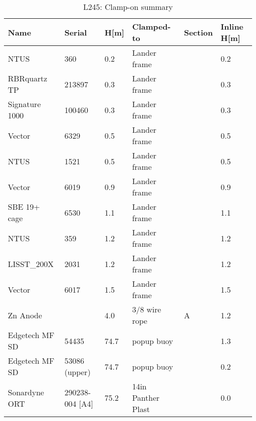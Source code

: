 \documentclass{article}
\begin{document}
\begin{table}[!htbp]
\centering
\caption{L245: Clamp-on summary}
\begin{tabular}{llllll}
\toprule
Name & Serial & H[m] & Clamped-to & Section & Inline H[m] \\
\midrule
NTUS & 360 & 0.2 & Lander frame &  & 0.2 \\
RBRquartz TP & 213897 & 0.3 & Lander frame &  & 0.3 \\
Signature 1000 & 100460 & 0.3 & Lander frame &  & 0.3 \\
Vector & 6329 & 0.5 & Lander frame &  & 0.5 \\
NTUS & 1521 & 0.5 & Lander frame &  & 0.5 \\
Vector & 6019 & 0.9 & Lander frame &  & 0.9 \\
SBE 19+ cage & 6530 & 1.1 & Lander frame &  & 1.1 \\
NTUS & 359 & 1.2 & Lander frame &  & 1.2 \\
LISST\_200X & 2031 & 1.2 & Lander frame &  & 1.2 \\
Vector & 6017 & 1.5 & Lander frame &  & 1.5 \\
Zn Anode &  & 4.0 & 3/8 wire rope & A & 1.2 \\
Edgetech MF SD & 54435 & 74.7 & popup buoy &  & 1.3 \\
Edgetech MF SD & 53086 (upper) & 74.7 & popup buoy &  & 0.2 \\
Sonardyne ORT & 290238-004 [A4] & 75.2 & 14in Panther Plast &  & 0.0 \\
\bottomrule
\end{tabular}
\end{table}
\end{document}
